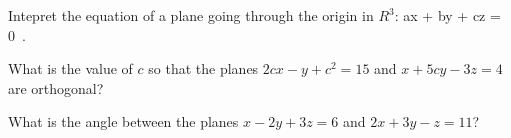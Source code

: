 \documentclass[12pt]{amsart}
\begin{document}
\begin{question}
	Intepret the equation of a plane going through the origin in $R^3$:
	ax + by + cz = 0 \,.
\end{question}
\vspace{5cm}

\begin{question}
	What is the value of $c$ so that the planes
	$2cx - y + c^2 = 15$ and $x + 5cy - 3z = 4$ are orthogonal?
\end{question}
\vspace{5cm}

\begin{question}
	What is the angle between the planes $x - 2y + 3z = 6$ and $2x + 3y -z = 11$?
\end{question}
\vspace{5cm}
%
%
%
%
%
%
%
%
\printbibliography
%
%
\end{document}
